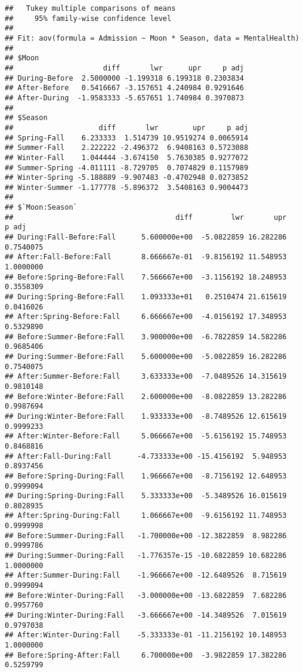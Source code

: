 \documentclass[
]{article}
\begin{document}
\begin{verbatim}
##   Tukey multiple comparisons of means
##     95% family-wise confidence level
## 
## Fit: aov(formula = Admission ~ Moon * Season, data = MentalHealth)
## 
## $Moon
##                     diff       lwr      upr     p adj
## During-Before  2.5000000 -1.199318 6.199318 0.2303834
## After-Before   0.5416667 -3.157651 4.240984 0.9291646
## After-During  -1.9583333 -5.657651 1.740984 0.3970873
## 
## $Season
##                    diff       lwr        upr     p adj
## Spring-Fall    6.233333  1.514739 10.9519274 0.0065914
## Summer-Fall    2.222222 -2.496372  6.9408163 0.5723088
## Winter-Fall    1.044444 -3.674150  5.7630385 0.9277072
## Summer-Spring -4.011111 -8.729705  0.7074829 0.1157989
## Winter-Spring -5.188889 -9.907483 -0.4702948 0.0273852
## Winter-Summer -1.177778 -5.896372  3.5408163 0.9004473
## 
## $`Moon:Season`
##                                      diff         lwr       upr     p adj
## During:Fall-Before:Fall      5.600000e+00  -5.0822859 16.282286 0.7540075
## After:Fall-Before:Fall       8.666667e-01  -9.8156192 11.548953 1.0000000
## Before:Spring-Before:Fall    7.566667e+00  -3.1156192 18.248953 0.3558309
## During:Spring-Before:Fall    1.093333e+01   0.2510474 21.615619 0.0416026
## After:Spring-Before:Fall     6.666667e+00  -4.0156192 17.348953 0.5329890
## Before:Summer-Before:Fall    3.900000e+00  -6.7822859 14.582286 0.9685406
## During:Summer-Before:Fall    5.600000e+00  -5.0822859 16.282286 0.7540075
## After:Summer-Before:Fall     3.633333e+00  -7.0489526 14.315619 0.9810148
## Before:Winter-Before:Fall    2.600000e+00  -8.0822859 13.282286 0.9987694
## During:Winter-Before:Fall    1.933333e+00  -8.7489526 12.615619 0.9999233
## After:Winter-Before:Fall     5.066667e+00  -5.6156192 15.748953 0.8468816
## After:Fall-During:Fall      -4.733333e+00 -15.4156192  5.948953 0.8937456
## Before:Spring-During:Fall    1.966667e+00  -8.7156192 12.648953 0.9999094
## During:Spring-During:Fall    5.333333e+00  -5.3489526 16.015619 0.8028935
## After:Spring-During:Fall     1.066667e+00  -9.6156192 11.748953 0.9999998
## Before:Summer-During:Fall   -1.700000e+00 -12.3822859  8.982286 0.9999786
## During:Summer-During:Fall   -1.776357e-15 -10.6822859 10.682286 1.0000000
## After:Summer-During:Fall    -1.966667e+00 -12.6489526  8.715619 0.9999094
## Before:Winter-During:Fall   -3.000000e+00 -13.6822859  7.682286 0.9957760
## During:Winter-During:Fall   -3.666667e+00 -14.3489526  7.015619 0.9797038
## After:Winter-During:Fall    -5.333333e-01 -11.2156192 10.148953 1.0000000
## Before:Spring-After:Fall     6.700000e+00  -3.9822859 17.382286 0.5259799

\end{verbatim}
\end{document}
